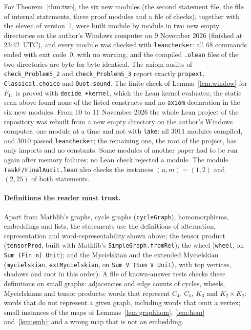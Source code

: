 \documentclass[11pt]{article}
\theoremstyle{remark}
\begin{document}
For Theorem~\ref{thm:two}, the six new modules (the second statement file,
the file of internal statements, three proof modules and a file of checks),
together with the eleven of version~1, were built module by module in two new
empty directories on the author's Windows computer on 9 November 2026 (finished
at 23:42~UTC), and every module was checked with \texttt{leanchecker}: all
$68$ commands ended with exit code~$0$, with no warning, and the compiled
\texttt{.olean} files of the two directories are byte for byte identical. The
axiom audits of \texttt{check\_Problem5\_2} and \texttt{check\_Problem5\_3}
report exactly \texttt{propext}, \texttt{Classical.choice} and
\texttt{Quot.sound}. The finite check of Lemma~\ref{lem:window} for $F_{11}$ is
proved with \texttt{decide +kernel}, which the Lean kernel evaluates; the
static scan above found none of the listed constructs and no \texttt{axiom}
declaration in the six new modules. From 10 to 11 November 2026 the whole Lean project of the repository was
rebuilt from a new empty directory on the author's Windows computer, one module
at a time and not with \texttt{lake}: all $3011$ modules compiled, and $3010$
passed \texttt{leanchecker}; the remaining one, the root of the project, has only
imports and no constants. Some modules of another paper had to be run again
after memory failures; no Lean check rejected a module. The module \texttt{TaskF/FinalAudit.lean} also checks
the instances $(n,m)=(1,2)$ and $(2,25)$ of both statements.

\paragraph{Definitions the reader must trust.}
Apart from Mathlib's graphs, cycle graphs (\texttt{cycleGraph}),
homomorphisms, embeddings and lists, the statements use the definitions of
alternation, representation and word-representability shown above; the
tensor product (\texttt{tensorProd}, built with Mathlib's
\texttt{SimpleGraph.fromRel}); the wheel (\texttt{wheel}, on
\texttt{Sum (Fin n) Unit}); and the Mycielskian and the extended Mycielskian
(\texttt{mycielskian}, \texttt{extMycielskian}, on
\texttt{Sum V (Sum V Unit)},
with top vertices, shadows and root in this order). A file of known-answer
tests checks these definitions on small graphs: adjacencies and edge counts
of cycles, wheels, Mycielskians and tensor products; words that represent
$C_4$, $C_5$, $K_3$ and $K_2\times K_2$; words that do not represent a given
graph, including words that omit a vertex; small instances of the maps of
Lemmas~\ref{lem:graphhom}, \ref{lem:hom} and~\ref{lem:emb}; and a wrong
map that is not an embedding.
\end{document}
